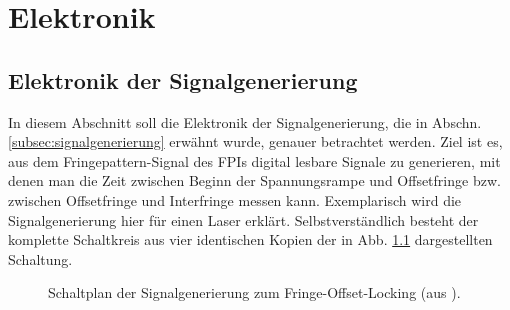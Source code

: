 \chapter{Elektronik}\label{anh:kap:elektronik}

\section{Elektronik der
Signalgenerierung}\label{anh:sec:signalgenerierung_elektronik} In diesem
Abschnitt soll die Elektronik der Signalgenerierung, die in Abschn. \ref{subsec:signalgenerierung} erwähnt wurde, genauer betrachtet werden.
Ziel ist es, aus dem Fringepattern-Signal des FPIs digital lesbare Signale zu
generieren, mit denen man die Zeit zwischen Beginn der
Spannungsrampe und Offsetfringe bzw. zwischen Offsetfringe
und Interfringe messen kann. Exemplarisch wird die Signalgenerierung hier
für einen Laser erklärt. Selbstverständlich besteht der komplette
Schaltkreis aus vier identischen Kopien der in Abb.
\ref{fig:signalgenerierung_schaltplan} dargestellten Schaltung.\par
\begin{figure}[h]
 	\centering
	\caption[Signalgenerierung - Schaltplan]{Schaltplan der
	Signalgenerierung zum Fringe-Offset-Locking (aus \cite{signalgenerierung}).}
	\label{fig:signalgenerierung_schaltplan}
\end{figure}
